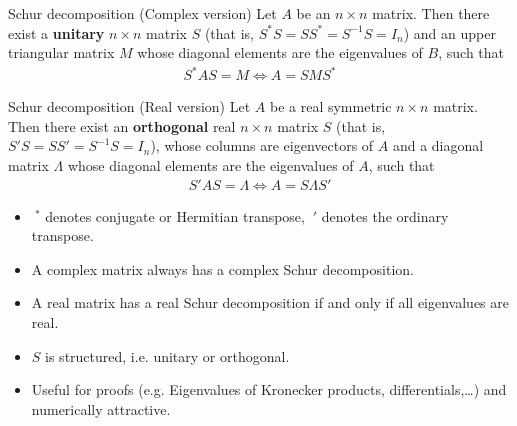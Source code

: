 \documentclass[10pt]{beamer}  %
\begin{document}
\begin{frame}[shrink]
\frametitle{\secname}\framesubtitle{}\footnotesize
\begin{block}{Schur decomposition (Complex version)}
  Let $A$ be an $n \times n$ matrix. Then there exist a \textbf{unitary} $n\times n$ matrix $S$ (that is, $S^*S=SS^*=S^{-1}S=I_n$) and an upper triangular matrix $M$ whose diagonal elements are the eigenvalues of $B$, such that
  \begin{align*}
    S^* A S = M \Leftrightarrow A = S M S^*
  \end{align*}
\end{block}
\begin{block}{Schur decomposition (Real version)}
  Let $A$ be a real symmetric $n \times n$ matrix. Then there exist an \textbf{orthogonal} real $n\times n$ matrix $S$ (that is, $S'S=SS'=S^{-1}S=I_n$), whose columns are eigenvectors of $A$ and a diagonal matrix $\Lambda$ whose diagonal elements are the eigenvalues of $A$, such that
  \begin{align*}
    S' A S = \Lambda \Leftrightarrow A = S \Lambda S'
  \end{align*}
\end{block}
\begin{itemize}
  \item $~^*$ denotes conjugate or Hermitian transpose, $~'$ denotes the ordinary transpose.
  \item A complex matrix always has a complex Schur decomposition.
  \item A real matrix has a real Schur decomposition if and only if all eigenvalues are real.
  \item $S$ is structured, i.e. unitary or orthogonal.
  \item Useful for proofs (e.g. Eigenvalues of Kronecker products, differentials,\dots) and numerically attractive.
\end{itemize}
\end{frame}
\end{document}
